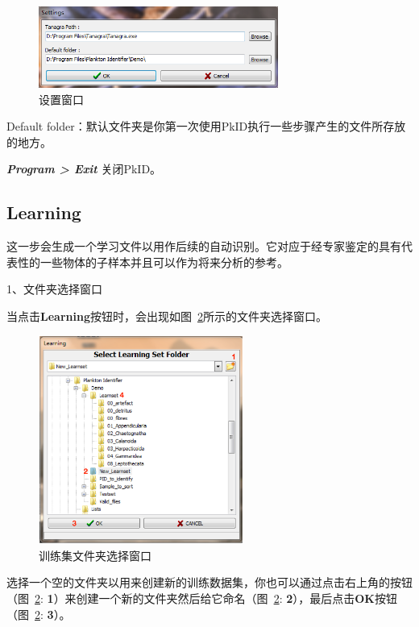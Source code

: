 \documentclass[12pt]{article}
\begin{document}
\begin{figure}[!ht]
\centering
\includegraphics[width=0.7\textwidth]{settingsWindow.png}
\caption{设置窗口}
\label{fig: Settings window}
\end{figure} 

Default folder：默认文件夹是你第一次使用PkID执行一些步骤产生的文件所存放的地方。

\textit{\textbf{Program > Exit}} 关闭PkID。

\subsection{Learning}

这一步会生成一个学习文件以用作后续的自动识别。它对应于经专家鉴定的具有代表性的一些物体的子样本并且可以作为将来分析的参考。

1、文件夹选择窗口

当点击\textbf{Learning}按钮时，会出现如图~\ref{fig: SelectLearningSetFolderWindow}所示的文件夹选择窗口。 

\begin{figure}[!ht]
\centering
\includegraphics[width=0.6\textwidth]{SelectLearningSetFolderWindow.eps}
\caption{训练集文件夹选择窗口}
\label{fig: SelectLearningSetFolderWindow}
\end{figure} 

选择一个空的文件夹以用来创建新的训练数据集，你也可以通过点击右上角的按钮（图~\ref{fig: SelectLearningSetFolderWindow}: {\color{red}\textbf{1}}）来创建一个新的文件夹然后给它命名（图~\ref{fig: SelectLearningSetFolderWindow}: {\color{red}\textbf{2}}），最后点击\textbf{OK}按钮（图~\ref{fig: SelectLearningSetFolderWindow}: {\color{red}\textbf{3}}）。
\end{document}
